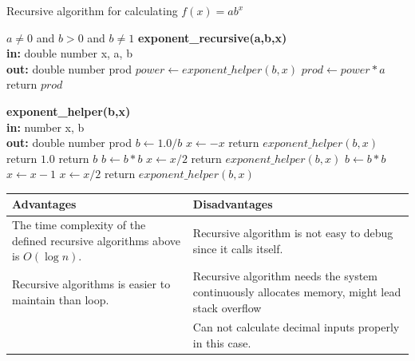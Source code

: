 \documentclass[11pt]{article}
\begin{document}
\begin{algorithm}
  \caption{Recursive algorithm for calculating $f(x) = ab^x$}
  \begin{algorithmic}[1]
  \Require $a \neq 0$ and $b > 0$ and $b \neq 1$ 
   \Function\textbf{\textbf{exponent\_recursive(a,b,x)}}\\
    \textbf{in: }double number x, a, b\\
    \textbf{out: }double number prod
    \State $power \gets exponent\_helper(b,x)$
    \State $prod \gets power * a$
    \State return $prod$
    \EndFunction
  \end{algorithmic}
\end{algorithm}

\begin{algorithm}
  \begin{algorithmic}[1]
   \Function\textbf{\textbf{exponent\_helper(b,x)}}\\
   \textbf{in: }number x, b\\
   \textbf{out: }double number prod
   \State $b \gets 1.0 / b$
   \State $x \gets -x$ 
   \State return $exponent\_helper(b, x)$ 
     \State return $1.0$
    \State return $b$
    \State $b \gets b * b$ 
    \State $x \gets x / 2$ 
    \State return $exponent\_helper(b, x)$
    \Else
    \State $b \gets b * b$ 
    \State $x \gets x - 1$ 
    \State $x \gets x / 2$ 
    \State return $exponent\_helper(b, x)$
    \EndIf 
   \EndFunction
  \end{algorithmic}
\end{algorithm}

\begin{center}
\begin{tabular}{|p{7cm}|p{7cm}|}
\hline
     \textbf{Advantages} & \textbf{Disadvantages}\\ \hline
     The time complexity of the defined recursive algorithms above is $O(\log n)$. & Recursive algorithm is not easy to debug since it calls itself.\\ \hline
     Recursive algorithms is easier to maintain than loop\cite{karigl1981recursive}. & Recursive algorithm needs the system continuously allocates memory, might lead stack overflow\cite{haberman2002case} \\ \hline
      & Can not calculate decimal inputs properly in this case.\\ \hline
\end{tabular}
\end{center}
\end{document}
